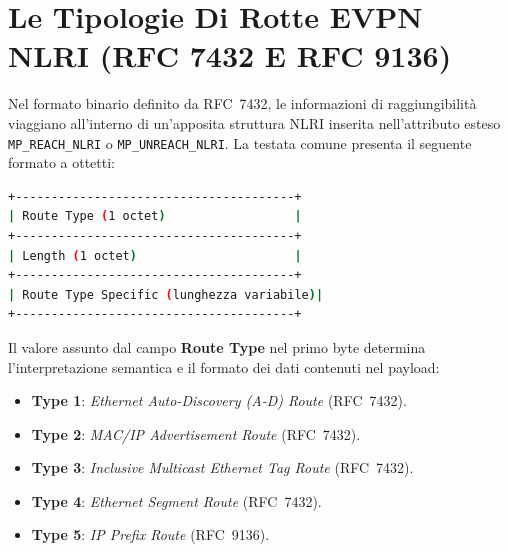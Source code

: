 \documentclass[11pt, a4paper]{article}
\begin{document}

\section{Le Tipologie Di Rotte EVPN NLRI (RFC 7432 E RFC 9136)}

Nel formato binario definito da RFC~7432, le informazioni di raggiungibilità viaggiano all'interno di un'apposita struttura NLRI inserita nell'attributo esteso \texttt{MP\_REACH\_NLRI} o \texttt{MP\_UNREACH\_NLRI}. La testata comune presenta il seguente formato a ottetti:


\begin{lstlisting}[language=bash]
+---------------------------------------+
| Route Type (1 octet)                  |
+---------------------------------------+
| Length (1 octet)                      |
+---------------------------------------+
| Route Type Specific (lunghezza variabile)|
+---------------------------------------+
\end{lstlisting}

Il valore assunto dal campo \textbf{Route Type} nel primo byte determina l'interpretazione semantica e il formato dei dati contenuti nel payload:
\begin{itemize}[noitemsep]
    \item \textbf{Type 1}: \emph{Ethernet Auto-Discovery (A-D) Route} (RFC~7432).
    \item \textbf{Type 2}: \emph{MAC/IP Advertisement Route} (RFC~7432).
    \item \textbf{Type 3}: \emph{Inclusive Multicast Ethernet Tag Route} (RFC~7432).
    \item \textbf{Type 4}: \emph{Ethernet Segment Route} (RFC~7432).
    \item \textbf{Type 5}: \emph{IP Prefix Route} (RFC~9136).
\end{itemize}

\end{document}
